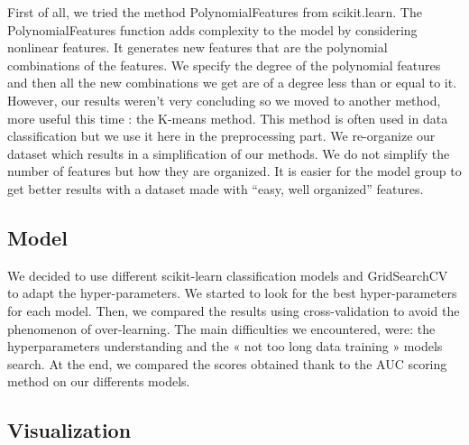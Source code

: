 \documentclass[10pt]{report}
\begin{document}
First of all, we tried the method PolynomialFeatures from scikit.learn. The PolynomialFeatures function adds complexity to the model by considering nonlinear features. It generates new features that are the polynomial combinations of the features. We specify the degree of the polynomial features and then all the new combinations we get are of a degree less than or equal to it. However, our results weren’t very concluding so we moved to another method, more useful this time : the K-means method. This method is often used in data classification but we use it here in the preprocessing part. We re-organize our dataset which results in a simplification of our methods. We do not simplify the number of features but how they are organized. It is easier for the model group to get better results with a dataset made with “easy, well organized” features.

\bigbreak

\subsection*{Model}

\bigbreak

We decided to use different scikit-learn classification models and GridSearchCV to adapt the hyper-parameters. We started to look for the best hyper-parameters for each model. Then, we compared the results using cross-validation to avoid the phenomenon of over-learning. The main difficulties we encountered, were: the hyperparameters understanding and the « not too long data training » models search. At the end, we compared the scores obtained thank to the AUC scoring method on our differents models.

\bigbreak

\subsection*{Visualization}

\bigbreak
\end{document}
